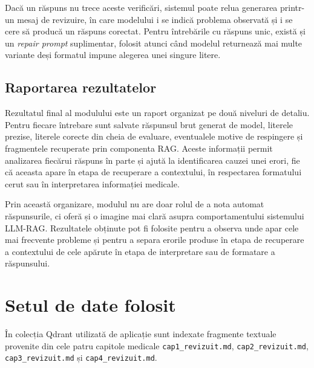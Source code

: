 \documentclass[12pt, a4paper, oneside, romanian]{teza-upb}
\begin{document}
Dacă un răspuns nu trece aceste verificări, sistemul poate relua generarea printr-un mesaj de revizuire, în care modelului i se indică problema observată și i se cere să producă un răspuns corectat. Pentru întrebările cu răspuns unic, există și un \textit{repair prompt} suplimentar, folosit atunci când modelul returnează mai multe variante deși formatul impune alegerea unei singure litere.

\subsection{Raportarea rezultatelor}

Rezultatul final al modulului este un raport organizat pe două niveluri de detaliu. Pentru fiecare întrebare sunt salvate răspunsul brut generat de model, literele prezise, literele corecte din cheia de evaluare, eventualele motive de respingere și fragmentele recuperate prin componenta RAG. Aceste informații permit analizarea fiecărui răspuns în parte și ajută la identificarea cauzei unei erori, fie că aceasta apare în etapa de recuperare a contextului, în respectarea formatului cerut sau în interpretarea informației medicale.

Prin această organizare, modulul nu are doar rolul de a nota automat răspunsurile, ci oferă și o imagine mai clară asupra comportamentului sistemului LLM-RAG. Rezultatele obținute pot fi folosite pentru a observa unde apar cele mai frecvente probleme și pentru a separa erorile produse în etapa de recuperare a contextului de cele apărute în etapa de interpretare sau de formatare a răspunsului.



\section{Setul de date folosit}

În colecția Qdrant utilizată de aplicație sunt indexate fragmente textuale provenite din cele patru capitole medicale \texttt{cap1\_revizuit.md}, \texttt{cap2\_revizuit.md}, \texttt{cap3\_revizuit.md} și \texttt{cap4\_revizuit.md}.
\end{document}

